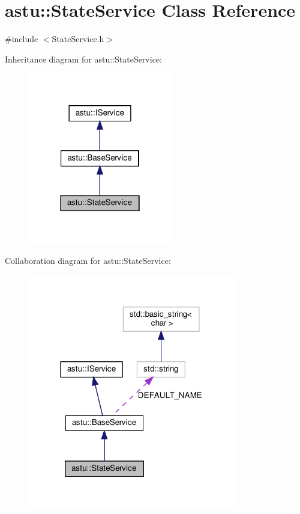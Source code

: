 \hypertarget{classastu_1_1StateService}{}\section{astu\+:\+:State\+Service Class Reference}
\label{classastu_1_1StateService}


{\ttfamily \#include $<$State\+Service.\+h$>$}



Inheritance diagram for astu\+:\+:State\+Service\+:\nopagebreak
\begin{figure}[H]
\begin{center}
\leavevmode
\includegraphics[width=178pt]{classastu_1_1StateService__inherit__graph}
\end{center}
\end{figure}


Collaboration diagram for astu\+:\+:State\+Service\+:\nopagebreak
\begin{figure}[H]
\begin{center}
\leavevmode
\includegraphics[width=258pt]{classastu_1_1StateService__coll__graph}
\end{center}
\end{figure}
